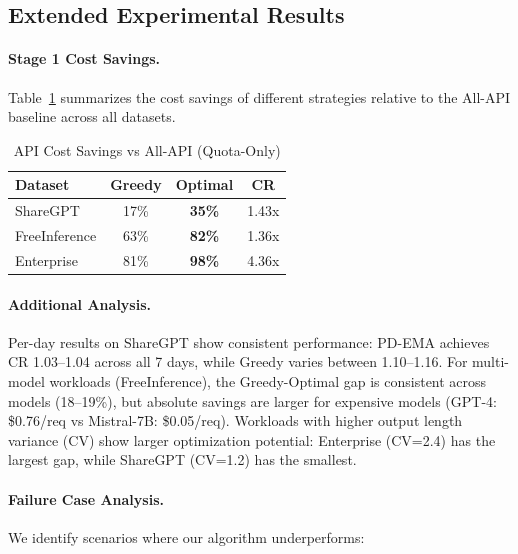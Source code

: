 \subsection{Extended Experimental Results}
\label{app:extended_results}

\paragraph{Stage 1 Cost Savings.}
Table~\ref{tab:stage1_savings} summarizes the cost savings of different strategies relative to the All-API baseline across all datasets.

\begin{table}[h]
\caption{API Cost Savings vs All-API (Quota-Only)}
\label{tab:stage1_savings}
\begin{center}
\begin{small}
\begin{sc}
\begin{tabular}{lccc}
\toprule
Dataset & Greedy & Optimal & CR \\
\midrule
ShareGPT & 17\% & \textbf{35\%} & 1.43x \\
FreeInference & 63\% & \textbf{82\%} & 1.36x \\
Enterprise & 81\% & \textbf{98\%} & 4.36x \\
\bottomrule
\end{tabular}
\end{sc}
\end{small}
\end{center}
\end{table}

\paragraph{Additional Analysis.}
Per-day results on ShareGPT show consistent performance: PD-EMA achieves CR 1.03--1.04 across all 7 days, while Greedy varies between 1.10--1.16. For multi-model workloads (FreeInference), the Greedy-Optimal gap is consistent across models (18--19\%), but absolute savings are larger for expensive models (GPT-4: \$0.76/req vs Mistral-7B: \$0.05/req). Workloads with higher output length variance (CV) show larger optimization potential: Enterprise (CV=2.4) has the largest gap, while ShareGPT (CV=1.2) has the smallest.

\paragraph{Failure Case Analysis.}
We identify scenarios where our algorithm underperforms:

